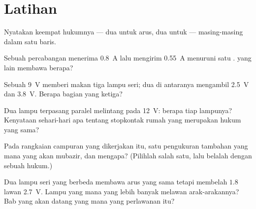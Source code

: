 \section{Latihan}

\begin{exercise}[$\star$]\label{exo:g8:circuit-laws:1}
Nyatakan keempat hukumnya --- dua untuk arus, dua untuk  ---
masing-masing dalam satu baris.
\end{exercise}

\begin{exercise}[$\star$]\label{exo:g8:circuit-laws:2}
Sebuah percabangan menerima \qty{0.8}{A} lalu mengirim \qty{0.55}{A}
menuruni satu .  yang lain membawa berapa?
\end{exercise}

\begin{exercise}[$\star$]\label{exo:g8:circuit-laws:3}
Sebuah  \qty{9}{V} memberi makan tiga lampu seri; dua di
antaranya mengambil \qty{2.5}{V} dan \qty{3.8}{V}. Berapa bagian yang
ketiga?
\end{exercise}

\begin{exercise}[$\star$]\label{exo:g8:circuit-laws:4}
Dua lampu terpasang paralel melintang pada  \qty{12}{V}: berapa
 tiap lampunya? Kenyataan sehari-hari apa tentang stopkontak
rumah yang merupakan hukum yang sama?
\end{exercise}

\begin{exercise}[$\star$]\label{exo:g8:circuit-laws:5}
Pada rangkaian campuran yang dikerjakan itu, satu pengukuran tambahan
yang mana yang akan mubazir, dan mengapa? (Pilihlah salah satu, lalu
belalah dengan sebuah hukum.)
\end{exercise}

\begin{exercise}[$\star$]\label{exo:g8:circuit-laws:6}
Dua lampu seri yang berbeda membawa arus yang sama tetapi membelah
 $1.8$ lawan \qty{2.7}{V}. Lampu yang mana yang lebih
banyak melawan arak-arakannya? Bab yang akan datang yang mana yang
 perlawanan itu?
\end{exercise}

